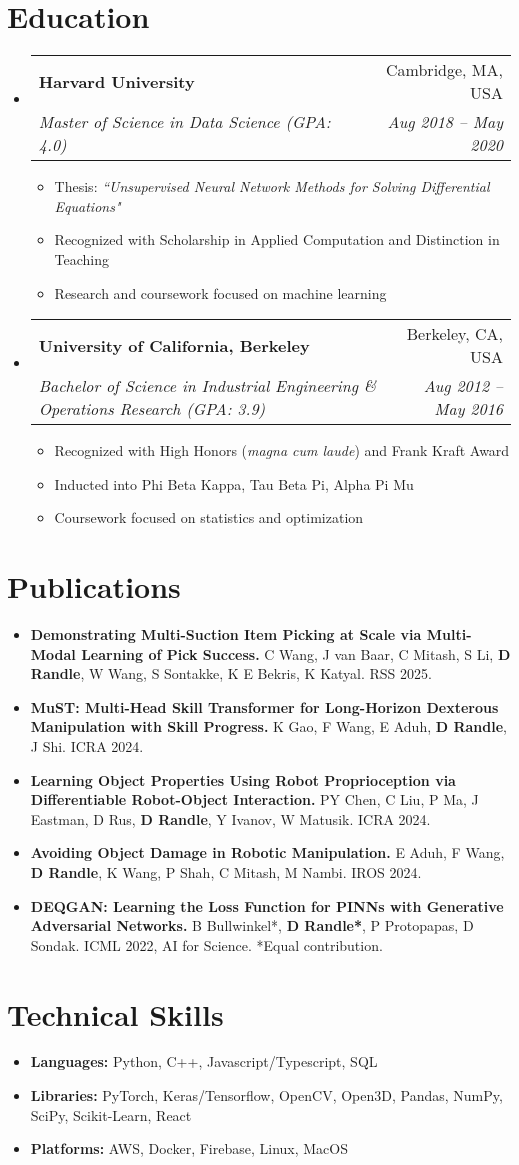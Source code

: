 \documentclass[a4paper,11pt]{article}
\makeatletter
\newcommand{\resumeItem}[1]{
  \item\small{#1}
}
\newcommand{\resumeItemListStart}{\begin{itemize}[rightmargin=0.11in]}
\newcommand{\resumeItemListEnd}{\end{itemize}}
\newcommand{\resumeQuadHeading}[4]{
  \item
  \begin{tabular*}{0.96\textwidth}[t]{l@{\extracolsep{\fill}}r}
    \textbf{#1} & #2 \\
    \textit{\small#3} & \textit{\small #4} \\
  \end{tabular*}
}
\newcommand{\resumeHeadingListStart}{
  \begin{itemize}[leftmargin=0.15in, label={}]
}
\newcommand{\resumeHeadingListEnd}{\end{itemize}}
\makeatother
\begin{document}
\section{Education}
  \resumeHeadingListStart{}
    \resumeQuadHeading{Harvard University}{Cambridge, MA, USA}
    {Master of Science in Data Science (GPA: 4.0)}{Aug 2018 -- May 2020}
    \resumeItemListStart{}
        \resumeItem{Thesis: \textit{``Unsupervised Neural Network Methods for Solving Differential Equations"}}
        \resumeItem{Recognized with Scholarship in Applied Computation and Distinction in Teaching}
        \resumeItem{Research and coursework focused on machine learning}
      
    \resumeItemListEnd{}
    \resumeQuadHeading{University of California, Berkeley}{Berkeley, CA, USA}
    {Bachelor of Science in Industrial Engineering \& Operations Research (GPA: 3.9)}{Aug 2012 -- May 2016}
    \resumeItemListStart{}
      \resumeItem{Recognized with High Honors (\textit{magna cum laude}) and Frank Kraft Award}
      \resumeItem{Inducted into Phi Beta Kappa, Tau Beta Pi, Alpha Pi Mu}
      \resumeItem{Coursework focused on statistics and optimization}
    \resumeItemListEnd{}
  \resumeHeadingListEnd{}


\section{Publications}
    \resumeItemListStart{}
        \resumeItem{\textbf{Demonstrating Multi-Suction Item Picking at Scale via Multi-Modal Learning of Pick Success.} C Wang, J van Baar, C Mitash, S Li, \textbf{D Randle}, W Wang, S Sontakke, K E Bekris, K Katyal. RSS 2025.}
        \resumeItem{\textbf{MuST: Multi-Head Skill Transformer for Long-Horizon Dexterous Manipulation with Skill Progress.} K Gao, F Wang, E Aduh, \textbf{D Randle}, J Shi. ICRA 2024.}
        \resumeItem{\textbf{Learning Object Properties Using Robot Proprioception via Differentiable Robot-Object Interaction.} PY Chen, C Liu, P Ma, J Eastman, D Rus, \textbf{D Randle}, Y Ivanov, W Matusik. ICRA 2024.}
        \resumeItem{\textbf{Avoiding Object Damage in Robotic Manipulation.} E Aduh, F Wang, \textbf{D Randle}, K Wang, P Shah, C Mitash, M Nambi. IROS 2024.}
        \resumeItem{\textbf{DEQGAN: Learning the Loss Function for PINNs with Generative Adversarial Networks.} B Bullwinkel*, \textbf{D Randle*}, P Protopapas, D Sondak. ICML 2022, AI for Science. *Equal contribution.}
    \resumeItemListEnd{}


\section{Technical Skills}
    \resumeItemListStart{}
        \resumeItem{\textbf{Languages:} Python, C++, Javascript/Typescript, SQL}
        \resumeItem{\textbf{Libraries:} PyTorch, Keras/Tensorflow, OpenCV, Open3D, Pandas, NumPy, SciPy, Scikit-Learn, React}
        \resumeItem{\textbf{Platforms:} AWS, Docker, Firebase, Linux, MacOS}
    \resumeItemListEnd{}
\end{document}
